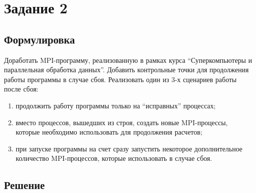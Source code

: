 \section*{Задание 2}
\subsection*{Формулировка}
Доработать MPI-программу, реализованную в рамках курса “Суперкомпьютеры и параллельная обработка данных”. Добавить контрольные точки для продолжения работы программы в случае сбоя. Реализовать один из 3-х сценариев работы после сбоя:
\begin{enumerate}
    \item продолжить работу программы только на “исправных” процессах;
    \item вместо процессов, вышедших из строя, создать новые MPI-процессы, которые необходимо использовать для продолжения расчетов;
    \item при запуске программы на счет сразу запустить некоторое дополнительное количество MPI-процессов, которые использовать в случае сбоя.
\end{enumerate}
\subsection*{Решение}
\inputminted[breaklines=true,breakanywhere=true]{c}{../task-2/main.c}